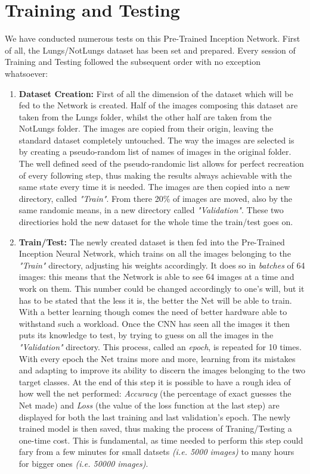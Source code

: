 \documentclass[../main.tex]{subfiles}
\begin{document}
\section{Training and Testing}
We have conducted numerous tests on this Pre-Trained Inception Network. First of all, the Lungs/NotLungs dataset has been set and prepared. Every session of Training and Testing followed the subsequent order with no exception whatsoever:
\begin{enumerate}
	\item \textbf{Dataset Creation:} First of all the dimension of the dataset which will be fed to the Network is created. Half of the images composing this dataset are taken from the Lungs folder, whilst the other half are taken from the NotLungs folder. The images are copied from their origin, leaving the standard dataset completely untouched. The way the images are selected is by creating a pseudo-random list of names of images in the original folder. The well defined seed of the pseudo-randomic list allows for perfect recreation of every following step, thus making the results always achievable with the same state every time it is needed. The images are then copied into a new directory, called \textit{"Train"}. From there 20\% of images are moved, also by the same randomic means, in a new directory called \textit{"Validation"}. These two directiories hold the new dataset for the whole time the train/test goes on.

	\item \textbf{Train/Test:} The newly created dataset is then fed into the Pre-Trained Inception Neural Network, which trains on all the images belonging to the \textit{"Train"} directory, adjusting his weights accordingly. It does so in \textit{batches} of 64 images: this means that the Network is able to see 64 images at a time and work on them. This number could be changed accordingly to one's will, but it has to be stated that the less it is, the better the Net will be able to train. With a better learning though comes the need of better hardware able to withstand such a workload. Once the CNN has seen all the images it then puts its knowledge to test, by trying to guess on all the images in the \textit{"Validation"} directory. This process, called an \textit{epoch}, is repeated for 10 times. With every epoch the Net trains more and more, learning from its mistakes and adapting to improve its ability to discern the images belonging to the two target classes. At the end of this step it is possible to have a rough idea of how well the net performed: \textit{Accuracy} (the percentage of exact guesses the Net made) and \textit{Loss} (the value of the loss function at the last step) are displayed for both the last training and last validation's epoch. The newly trained model is then saved, thus making the process of Traning/Testing a one-time cost. This is fundamental, as time needed to perform this step could fary from a few minutes for small datsets \textit{(i.e. 5000 images)} to many hours for bigger ones \textit{(i.e. 50000 images)}.


\end{enumerate}
\end{document}
